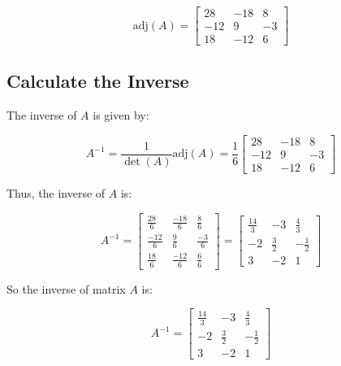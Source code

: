 \documentclass{article}
\begin{document}
\[
\text{adj}(A) = \begin{bmatrix}
28 & -18 & 8 \\
-12 & 9 & -3 \\
18 & -12 & 6
\end{bmatrix}
\]

\subsection{Calculate the Inverse}
The inverse of \(A\) is given by:

\[
A^{-1} = \frac{1}{\det(A)} \text{adj}(A) = \frac{1}{6} \begin{bmatrix}
28 & -18 & 8 \\
-12 & 9 & -3 \\
18 & -12 & 6
\end{bmatrix}
\]

Thus, the inverse of \(A\) is:

\[
A^{-1} = \begin{bmatrix}
\frac{28}{6} & \frac{-18}{6} & \frac{8}{6} \\
\frac{-12}{6} & \frac{9}{6} & \frac{-3}{6} \\
\frac{18}{6} & \frac{-12}{6} & \frac{6}{6}
\end{bmatrix}
= \begin{bmatrix}
\frac{14}{3} & -3 & \frac{4}{3} \\
-2 & \frac{3}{2} & -\frac{1}{2} \\
3 & -2 & 1
\end{bmatrix}
\]

So the inverse of matrix \(A\) is:

\[
A^{-1} = \begin{bmatrix}
\frac{14}{3} & -3 & \frac{4}{3} \\
-2 & \frac{3}{2} & -\frac{1}{2} \\
3 & -2 & 1
\end{bmatrix}
\]
\end{document}
